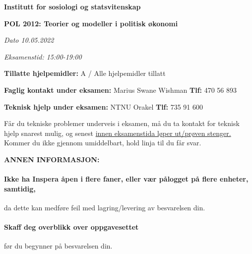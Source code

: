 \documentclass[a4paper,12pt,fleqn]{article}
\newcommand{\institusjon}{Institutt for sosiologi og statsvitenskap}
\newcommand{\tittelhd}{POL 2012: Teorier og modeller i politisk økonomi}
\newcommand{\examdate}{10.05.2022}
\newcommand{\examtime}{15:00-19:00}
\begin{document}
\begin{center}
\large\textbf{\institusjon}
\end{center}
\vspace{.5cm}

\begin{center}
\large\textbf{\tittelhd}
\end{center}

\begin{center}
\textit{Dato \examdate}
\end{center}

\begin{center}
\textit{Eksamenstid: \examtime}
\end{center}

\vspace{.5cm}

\begin{center}
	\textbf{Tillatte hjelpemidler:} A / Alle hjelpemidler tillatt
\end{center}

\begin{center}
	\textbf{Faglig kontakt under eksamen:} Marius Swane Wishman
	\textbf{Tlf:} 470 56 893
\end{center}

\begin{center}
	\textbf{Teknisk hjelp under eksamen:} NTNU Orakel
	\textbf{Tlf:} 735 91 600
\end{center}


Får du tekniske problemer underveis i eksamen, må du ta kontakt for teknisk
hjelp snarest mulig, og senest \underline{innen eksamenstida løper
ut/prøven stenger.} Kommer du ikke gjennom umiddelbart, hold linja til du får
svar.

\vspace{.5cm}

\begin{center}
	\textbf{ANNEN INFORMASJON:}
\end{center}

\paragraph{\textbf{Ikke ha Inspera åpen i flere faner, eller vær pålogget på
flere enheter, samtidig,}} da dette kan medføre feil med lagring/levering av
besvarelsen din.

\paragraph{\textbf{Skaff deg overblikk over oppgavesettet}} før du begynner på
besvarelsen din.
\end{document}
